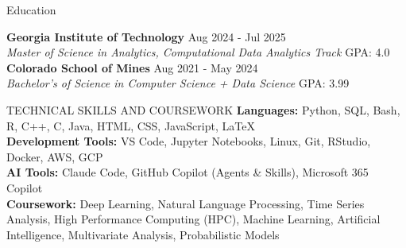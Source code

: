 \documentclass{resume} %
\begin{document}
\vspace{-16pt}

\begin{rSection}{Education}

{\bf Georgia Institute of Technology} \hfill {Aug 2024 - Jul 2025}\\
\textit{Master of Science in Analytics, Computational Data Analytics Track} \hfill {GPA: 4.0} \\ [1em]
{\bf Colorado School of Mines} \hfill {Aug 2021 - May 2024}\\
\textit{Bachelor's of Science in Computer Science + Data Science} \hfill {GPA: 3.99}\\


\end{rSection}
\vspace{-18pt}

\begin{rSection}{TECHNICAL SKILLS AND COURSEWORK}
   \textbf{Languages:} Python, SQL, Bash, R, C++, C, Java, HTML, CSS, JavaScript, LaTeX\\
   \textbf{Development Tools:} VS Code, Jupyter Notebooks, Linux, Git, RStudio, Docker, AWS, GCP \\
   \textbf{AI Tools:} Claude Code, GitHub Copilot (Agents \& Skills), Microsoft 365 Copilot \\
   \textbf{Coursework:} Deep Learning, Natural Language Processing, Time Series Analysis, High Performance Computing (HPC), Machine Learning, Artificial Intelligence, Multivariate Analysis, Probabilistic Models
   \end{rSection}
   \vspace{-10pt}
\end{document}
